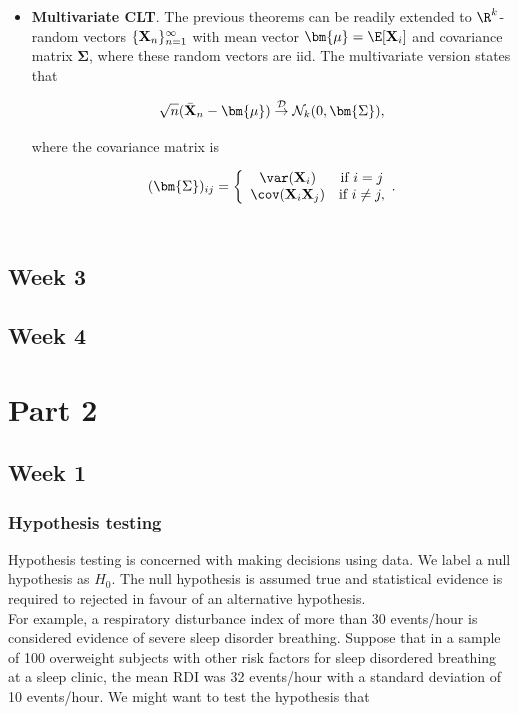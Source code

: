 \documentclass{homework}
\begin{document}
\begin{itemize}
   \item \textbf{Multivariate CLT}. The previous theorems can be readily extended to $\R^k$-random vectors $\{{\bf X}_n\}_{n=1}^{\infty}$ with mean vector $\bm{\mu}=\E[\X_i]$ and covariance matrix $\bm{\Sigma}$, where these random vectors are iid. The multivariate version states that 
   
   $$
   \sqrt{n}(\bar{\X}_n - \bm{\mu}) \overset{\mathcal{D}}{\rightarrow} \mathcal{N}_k (0, \bm{\Sigma}),
   $$
   
   where the covariance matrix is 
   
   $$
   (\bm{\Sigma})_{ij} = \bigg\{ \begin{array}{ccc}
       \var(\X_i)  & \textnormal{if } i=j  \\
       \cov(\X_i \X_j)  & \textnormal{if } i \neq j, 
    \end{array}.
   $$ \\
\end{itemize}

\subsection{Week 3}

\subsection{Week 4}

\clearpage

\section{Part 2}
\subsection{Week 1}

\subsubsection{Hypothesis testing}

Hypothesis testing is concerned with making decisions using data. We label a null hypothesis as $H_0$. The null hypothesis is assumed true and statistical evidence is required to rejected in favour of an alternative hypothesis. \\

For example, a respiratory disturbance index of more than 30 events/hour is considered evidence of severe sleep disorder breathing. Suppose that in a sample of 100 overweight subjects with other risk factors for sleep disordered breathing at a sleep clinic, the mean RDI was 32 events/hour with a standard deviation of 10 events/hour. We might want to test the hypothesis that 
\end{document}
